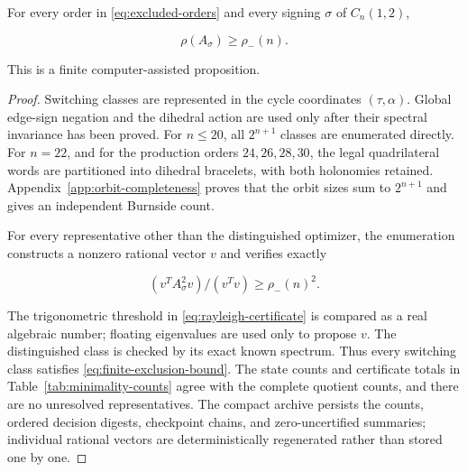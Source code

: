 \begin{proposition}
\label{prop:finite-exclusion}
For every order in \eqref{eq:excluded-orders} and every
signing \(\sigma\) of \(C_n(1,2)\),

\begin{equation}
\label{eq:finite-exclusion-bound}
\rho(A_\sigma)\geq \rho_-(n).
\end{equation}

This is a finite computer-assisted proposition.

\end{proposition}
\begin{proof}
Switching classes are represented in the cycle coordinates
\((\tau,\alpha)\). Global edge-sign negation and the dihedral action are used only after
their spectral invariance has been proved. For \(n\leq 20\), all \(2^{n+1}\) classes
are enumerated directly. For \(n=22\), and for the production orders
\(24,26,28,30\), the legal quadrilateral words are partitioned into dihedral
bracelets, with both holonomies retained. Appendix~\ref{app:orbit-completeness} proves that the orbit
sizes sum to \(2^{n+1}\) and gives an independent Burnside count.

For every representative other than the distinguished optimizer, the
enumeration constructs a nonzero rational vector \(v\) and verifies exactly

\begin{equation}
\label{eq:rayleigh-certificate}
(v^T A_\sigma^{2} v)/(v^T v) \geq  \rho_-(n)^{2}.
\end{equation}

The trigonometric threshold in \eqref{eq:rayleigh-certificate} is compared as a real algebraic number;
floating eigenvalues are used only to propose \(v\). The distinguished class is
checked by its exact known spectrum. Thus every switching class satisfies
\eqref{eq:finite-exclusion-bound}. The state counts and certificate totals in Table~\ref{tab:minimality-counts} agree with the
complete quotient counts, and there are no unresolved representatives.
The compact archive persists the counts, ordered decision digests, checkpoint
chains, and zero-uncertified summaries; individual rational vectors are
deterministically regenerated rather than stored one by one.


\end{proof}
